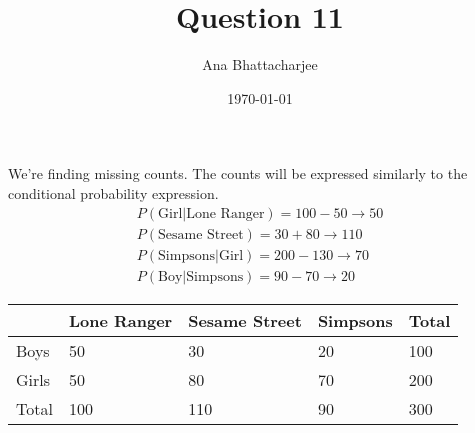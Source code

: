 \documentclass{article}
\begin{document}
\title{Question 11}
\author{Ana Bhattacharjee}
\date{\today}
\maketitle

\begin{center}
We're finding missing counts. The counts will be expressed similarly to the conditional probability expression.
  \begin{align}
    P(\text{Girl} | \text{Lone Ranger}) = 100 - 50 \rightarrow 50 \\
    P(\text{Sesame Street}) = 30 + 80 \rightarrow 110 \\
    P(\text{Simpsons} | \text{Girl}) = 200 - 130 \rightarrow 70 \\
    P(\text{Boy} | \text{Simpsons}) = 90 - 70 \rightarrow 20
  \end{align}
\end{center}

\begin{table}[ht]
\vspace{-1.5em}
\centering
\begin{tabular}{|l|l|l|l|l|}
\hline
 & Lone Ranger & Sesame Street & Simpsons & Total \\ \hline
Boys & 50 & 30 & 20 & 100 \\ \hline
Girls & 50 & 80 & 70 & 200 \\ \hline
Total & 100 & 110 & 90 & 300 \\ \hline
\end{tabular}
\end{table}
\end{document}
